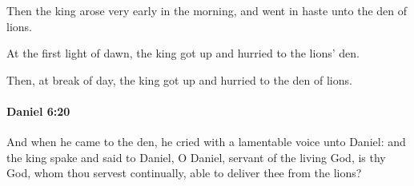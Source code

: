 			\begin{versebox}
					\item[BHS] 
					\item[LXX] 
					\item[ASV] Then the king arose very early in the morning, and went in haste unto the den of lions.
					\item[NIV] At the first light of dawn, the king got up and hurried to the lions’ den.
					\item[NRSV] Then, at break of day, the king got up and hurried to the den of lions.
			\end{versebox}

		\paragraph{Daniel 6:20} %
			\label{DANIEL-6-20}

			And when he came to the den, he cried with a lamentable voice unto Daniel: and the king spake and said to Daniel, O Daniel, servant of the living God, is thy God, whom thou servest continually, able to deliver thee from the lions?

